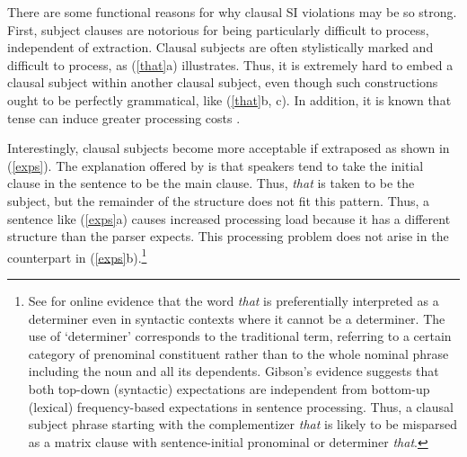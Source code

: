 \documentclass[output=paper
 	        ,biblatex
                ,babelshorthands
                ,newtxmath
                ,draftmode
                ,colorlinks, citecolor=brown
]{langscibook}
\begin{document}
\zl

%



There are some functional reasons for why clausal SI violations may be so strong. First, subject clauses are notorious for being particularly difficult to process, independent of extraction. Clausal  subjects  are often  stylistically marked and difficult  to process,   as  (\ref{that}a) illustrates. Thus, it is extremely hard to embed a  clausal subject within another clausal subject, even though such constructions ought to be perfectly grammatical,  like (\ref{that}b, c). In addition, it is known that tense can induce greater processing costs
 \citep{kluender92,gibson0000}. 

\eal  \label{that}

 
\zl


\noindent
 Interestingly, clausal subjects become more acceptable if  extraposed as shown in (\ref{exps}).
The explanation offered by  \citet[356--357]{fod74} is that speakers tend to  take the initial clause in the sentence  to be the  main clause. Thus, \emph{that} is taken to be the subject, but the remainder
of the structure does not fit this pattern. Thus, a sentence like (\ref{exps}a) causes
 increased  processing  load  because  it has a  different structure 
than the parser expects.
This processing problem does not arise
in the counterpart in (\ref{exps}b).\footnote{See  \citet{gibson07} for online evidence
that  the word \emph{that} is preferentially interpreted as a determiner even in syntactic contexts where it cannot be a determiner. The use of `determiner' corresponds to the traditional term, referring to a certain category of
 prenominal constituent rather than to the whole nominal phrase including the noun and all its dependents.
 Gibson's evidence suggests that both top-down (syntactic) expectations are independent from bottom-up (lexical) frequency-based expectations in sentence processing. Thus, 
a clausal subject phrase  starting with the complementizer
\emph{that} is likely to be misparsed as a matrix clause with sentence-initial  pronominal or determiner \emph{that}.}
\end{document}

